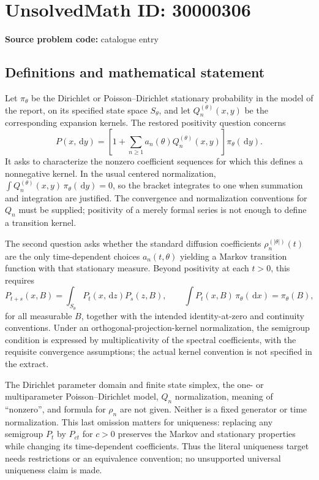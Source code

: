 \documentclass[11pt]{article}
\newcommand{\dd}{\,\mathrm{d}}
\begin{document}
\section*{UnsolvedMath ID: 30000306}
\textbf{Source problem code:} catalogue entry
\subsection{Definitions and mathematical statement}
Let $\pi_\theta$ be the Dirichlet or Poisson--Dirichlet stationary probability in the model of the report, on its specified state space $S_\theta$, and let $Q_n^{(\theta)}(x,y)$ be the corresponding expansion kernels. The restored positivity question concerns
\[
 P(x,\dd y)=\left[1+\sum_{n\ge1}a_n(\theta)
                              Q_n^{(\theta)}(x,y)\right]\pi_\theta(\dd y).
\]
It asks to characterize the nonzero coefficient sequences for which this defines a nonnegative kernel. In the usual centered normalization, $\int Q_n^{(\theta)}(x,y)\,\pi_\theta(\dd y)=0$, so the bracket integrates to one when summation and integration are justified. The convergence and normalization conventions for $Q_n$ must be supplied; positivity of a merely formal series is not enough to define a transition kernel.

The second question asks whether the standard diffusion coefficients $\rho_n^{(|\theta|)}(t)$ are the only time-dependent choices $a_n(t,\theta)$ yielding a Markov transition function with that stationary measure. Beyond positivity at each $t>0$, this requires
\[
 P_{t+s}(x,B)=\int_{S_\theta}P_t(x,\dd z)P_s(z,B),\qquad
 \int P_t(x,B)\,\pi_\theta(\dd x)=\pi_\theta(B),
\]
for all measurable $B$, together with the intended identity-at-zero and continuity conventions. Under an orthogonal-projection-kernel normalization, the semigroup condition is expressed by multiplicativity of the spectral coefficients, with the requisite convergence assumptions; the actual kernel convention is not specified in the extract.

The Dirichlet parameter domain and finite state simplex, the one- or multiparameter Poisson--Dirichlet model, $Q_n$ normalization, meaning of ``nonzero'', and formula for $\rho_n$ are not given. Neither is a fixed generator or time normalization. This last omission matters for uniqueness: replacing any semigroup $P_t$ by $P_{ct}$ for $c>0$ preserves the Markov and stationary properties while changing its time-dependent coefficients. Thus the literal uniqueness target needs restrictions or an equivalence convention; no unsupported universal uniqueness claim is made.
\end{document}
